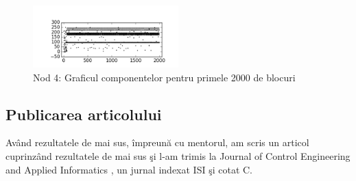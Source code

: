 \documentclass{llncs}
\begin{document}
\begin{figure}
\begin{center}
\includegraphics[width=0.5\textwidth]{img/carouri_db4.png}    %
\caption{Nod 4: Graficul componentelor pentru primele 2000 de blocuri} 
\label{fig:carouri_db4}
\end{center}
\end{figure}

\subsection{Publicarea articolului}

Av\^{a}nd rezultatele de mai sus, \^{i}mpreun\u{a} cu mentorul, am scris un articol cuprinz\^{a}nd rezultatele de mai sus \c{s}i l-am trimis la Journal of Control Engineering and Applied Informatics \cite{Ceai:2015}, un jurnal indexat ISI \c{s}i cotat C.
%
%
%
\clearpage


\end{document}
